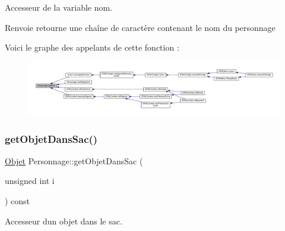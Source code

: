 Accesseur de la variable nom. 

\begin{DoxyReturn}{Renvoie}
retourne une chaîne de caractère contenant le nom du personnage 
\end{DoxyReturn}
Voici le graphe des appelants de cette fonction \+:\nopagebreak
\begin{figure}[H]
\begin{center}
\leavevmode
\includegraphics[width=350pt]{class_personnage_a411597dd00afced2f6eeb70461833dbe_icgraph}
\end{center}
\end{figure}
\mbox{\label{class_personnage_a32cf123b507c36c8adbf9bd22cb0b9a2}} 
\subsubsection{\texorpdfstring{get\+Objet\+Dans\+Sac()}{getObjetDansSac()}}
{\footnotesize\ttfamily \hyperlink{class_objet}{Objet} Personnage\+::get\+Objet\+Dans\+Sac (\begin{DoxyParamCaption}\item[{unsigned int}]{i }\end{DoxyParamCaption}) const}



Accesseur d\textquotesingle{}un objet dans le sac. 


